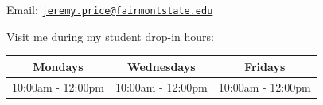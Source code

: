 \documentclass{tufte-handout}
\begin{document}
\noindent {}Email: \href{mailto:jeremy.price@fairmontstate.edu}{\nolinkurl{jeremy.price@fairmontstate.edu}}

\noindent Visit me during my student drop-in hours:
\begin{table}[ht]
  \centering
  \begin{tabular}{ccc}
    \toprule
    Mondays & Wednesdays & Fridays \\
    \midrule
    10:00am - 12:00pm & 10:00am - 12:00pm & 10:00am - 12:00pm \\
    \bottomrule
  \end{tabular}
\end{table}
\newpage
\end{document}
